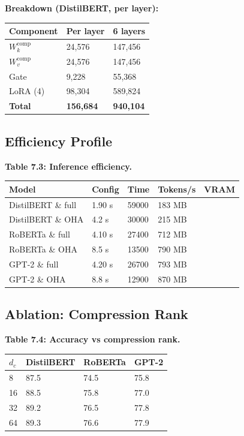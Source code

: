 \textbf{Breakdown (DistilBERT, per layer):}

\begin{table}[H]
\centering
\small
\begin{tabular}{lll}
\toprule
\textbf{Component} & \textbf{Per layer} & \textbf{6 layers} \\
\midrule
$W_k^\text{comp}$ & 24,576 & 147,456 \\
$W_v^\text{comp}$ & 24,576 & 147,456 \\
Gate & 9,228 & 55,368 \\
LoRA (4) & 98,304 & 589,824 \\
\textbf{Total} & \textbf{156,684} & \textbf{940,104} \\
\bottomrule
\end{tabular}
\end{table}

\subsection{Efficiency Profile}

\textbf{Table 7.3: Inference efficiency.}

\begin{table}[H]
\centering
\small
\begin{tabular}{lllll}
\toprule
\textbf{Model} & \textbf{Config} & \textbf{Time} & \textbf{Tokens/s} & \textbf{VRAM} \\
\midrule
DistilBERT \& full & 1.90 s & 59000 & 183 MB \\
DistilBERT \& OHA & 4.2 s & 30000 & 215 MB \\
RoBERTa \& full & 4.10 s & 27400 & 712 MB \\
RoBERTa \& OHA & 8.5 s & 13500 & 790 MB \\
GPT-2 \& full & 4.20 s & 26700 & 793 MB \\
GPT-2 \& OHA & 8.8 s & 12900 & 870 MB \\
\bottomrule
\end{tabular}
\end{table}

\subsection{Ablation: Compression Rank}

\textbf{Table 7.4: Accuracy vs compression rank.}

\begin{table}[H]
\centering
\small
\begin{tabular}{llll}
\toprule
\textbf{$d_c$} & \textbf{DistilBERT} & \textbf{RoBERTa} & \textbf{GPT-2} \\
\midrule
8 & 87.5 & 74.5 & 75.8 \\
16 & 88.5 & 75.8 & 77.0 \\
32 & 89.2 & 76.5 & 77.8 \\
64 & 89.3 & 76.6 & 77.9 \\
\bottomrule
\end{tabular}
\end{table}


